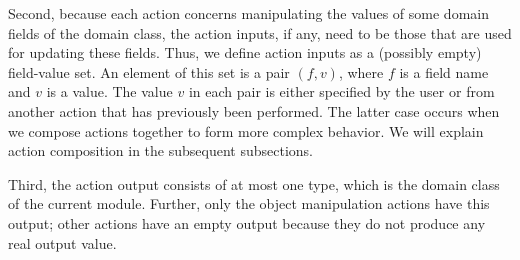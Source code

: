 Second, because each action concerns manipulating the values of some domain fields of the domain class, the action inputs, if any, need to be those that are used for updating these fields. Thus, we define action inputs as a (possibly empty) field-value set. An element of this set is a pair $(f,v)$, where $f$ is a field name and $v$ is a value. The value $v$ in each pair is either specified by the user or from another action that has previously been performed. The latter case occurs when we compose actions together to form more complex behavior. We will explain action composition in the subsequent subsections.

%
Third, the action output consists of at most one type, which is the domain class of the current module. Further, only the object manipulation actions have this output; other actions have an empty output because they do not produce any real output value.
\vspace{-0.4cm}
